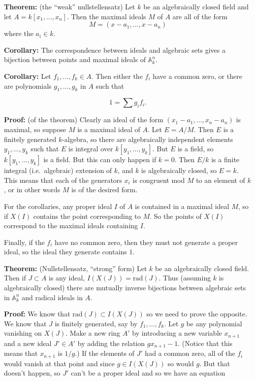 \documentclass[]{article}
\begin{document}
\textbf{Theorem:} (the ``weak'' nullstellensatz) Let \(k\) be an
algebraically closed field and let \(A=k[x_1,\ldots, x_n]\). Then the
maximal ideals \(M\) of \(A\) are all of the form
\[M=(x-a_1,\ldots, x-a_n)\] where the \(a_i\in k\).

\textbf{Corollary:} The correspondence between ideals and algebraic sets
gives a bijection between points and maximal ideals of
\(\mathbb{A}^{n}_{k}\).

\textbf{Corollary:} Let \(f_1,\ldots, f_k\in A\). Then either the
\(f_{i}\) have a common zero, or there are polynomials
\(g_1,\ldots, g_k\) in \(A\) such that

\[
1=\sum g_{i}f_{i}.
\]

\textbf{Proof:} (of the theorem) Clearly an ideal of the form
\((x_1-a_1,\ldots, x_n-a_n)\) is maximal, so suppose \(M\) is a maximal
ideal of \(A\). Let \(E=A/M\). Then \(E\) is a finitely generated
\(k\)-algebra, so there are algebraically independent elements
\(y_1,\ldots, y_k\) such that \(E\) is integral over
\(k[y_1,\ldots, y_k]\). But \(E\) is a field, so \(k[y_1,\ldots, y_k]\)
is a field. But this can only happen if \(k=0\). Then \(E/k\) is a
finite integral (i.e.~algebraic) extension of \(k\), and \(k\) is
algebraically closed, so \(E=k\). This means that each of the generators
\(x_i\) is congruent mod \(M\) to an element of \(k\), or in other words
\(M\) is of the desired form.

For the corollaries, any proper ideal \(I\) of \(A\) is contained in a
maximal ideal \(M\), so if \(X(I)\) contains the point corresponding to
\(M\). So the points of \(X(I)\) correspond to the maximal ideals
containing \(I\).

Finally, if the \(f_i\) have no common zero, then they must not generate
a proper ideal, so the ideal they generate contains \(1\).

\textbf{Theorem:} (Nullstellensatz, ``strong'' form) Let \(k\) be an
algebraically closed field. Then if \(J\subset A\) is any ideal,
\(I(X(J))=\mathrm{rad}(J)\). Thus (assuming \(k\) is algebraically
closed) there are mutually inverse bijections between algebraic sets in
\(\mathbb{A}^{n}_{k}\) and radical ideals in \(A\).

\textbf{Proof:} We know that \(\mathrm{rad}(J)\subset I(X(J))\) so we
need to prove the opposite. We know that \(J\) is finitely generated,
say by \(f_1,\ldots, f_k\). Let \(g\) be any polynomial vanishing on
\(X(J)\). Make a new ring \(A'\) by introducing a new variable
\(x_{n+1}\) and a new ideal \(J'\in A'\) by adding the relation
\(gx_{n+1}-1\). (Notice that this means that \(x_{n+1}\) is \(1/g\).) If
the elements of \(J'\) had a common zero, all of the \(f_{i}\) would
vanish at that point and since \(g\in I(X(J))\) so would \(g\). But that
doesn't happen, so \(J'\) can't be a proper ideal and so we have an
equation
\end{document}
